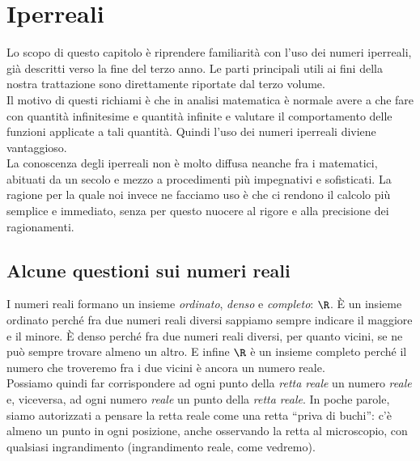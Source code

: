 



\chapter{Iperreali}
\label{sec:01_introduzione}
Lo scopo di questo capitolo è riprendere familiarità con l'uso 
dei numeri iperreali, già descritti verso la fine del terzo anno. 
Le parti principali utili ai fini della nostra trattazione sono 
direttamente riportate dal terzo volume.\\
Il motivo di questi richiami è che in analisi matematica è normale 
avere a che fare con quantità infinitesime e quantità infinite e 
valutare il comportamento delle funzioni applicate a tali quantità. 
Quindi l'uso dei numeri iperreali diviene vantaggioso.\\
La conoscenza degli iperreali non è molto diffusa neanche fra i matematici, 
abituati da un secolo e mezzo a procedimenti più impegnativi e sofisticati.
La ragione per la quale noi invece ne facciamo uso è che ci rendono il 
calcolo 
più semplice e immediato, senza per questo nuocere al rigore e alla 
precisione dei ragionamenti.

\section{Alcune questioni sui numeri reali}
\label{sec:insnum_reali}

I numeri reali formano un insieme \emph{ordinato}, \emph{denso} e 
\emph{completo}: \(\R\). È un insieme ordinato perché fra due numeri reali
diversi sappiamo sempre indicare il maggiore e il minore. È denso
perché fra due numeri reali diversi, per quanto vicini, se ne può 
sempre trovare almeno un altro. E infine \(\R\) è un insieme completo 
perché il numero che troveremo fra i due vicini è ancora un numero reale.\\
Possiamo quindi far corrispondere ad ogni punto della \emph{retta reale} un 
numero \emph{reale} e, viceversa, ad ogni numero \emph{reale} un punto 
della \emph{retta reale}. In poche parole, siamo
autorizzati a pensare la retta reale come una retta ``priva di buchi'':
c'è almeno un punto in ogni posizione, anche osservando la retta al 
microscopio, con qualsiasi ingrandimento (ingrandimento reale, come 
vedremo).

